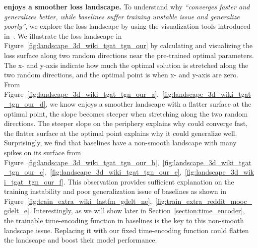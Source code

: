 \noindent\textbf{\our enjoys a smoother loss landscape.}
To understand why \emph{``\our converges faster and generalizes better, while baselines suffer training unstable issue and generalize poorly''}, we explore the loss landscape by using the visualization tools introduced in~\cite{visualloss}.
We illustrate the loss landscape in Figure~\ref{fig:landscape_3d_wiki_tgat_tgn_our} by calculating and visualizing the loss surface along two random directions near the pre-trained optimal parameters. The x- and y-axis indicate how much the optimal solution is stretched along the two random directions, and the optimal point is when x- and y-axis are zero.
 From Figure~\ref{fig:landscape_3d_wiki_tgat_tgn_our_a},~\ref{fig:landscape_3d_wiki_tgat_tgn_our_d}, we know \our enjoys a smoother landscape with a flatter surface at the optimal point, the slope becomes steeper when stretching along the two random directions. The steeper slope on the periphery explains why \our could converge fast, the flatter surface at the optimal point explains why it could generalize well.
 Surprisingly, we find that baselines have a non-smooth landscape with many spikes on its surface from Figure~\ref{fig:landscape_3d_wiki_tgat_tgn_our_b},~\ref{fig:landscape_3d_wiki_tgat_tgn_our_c},~\ref{fig:landscape_3d_wiki_tgat_tgn_our_e},~\ref{fig:landscape_3d_wiki_tgat_tgn_our_f}. This observation provides sufficient explanation on the training instability and poor generalization issue of baselines as shown in Figure~\ref{fig:train_extra_wiki_lastfm_gdelt_ne},~\ref{fig:train_extra_reddit_mooc_gdelt_e}. Interestingly, as we will show later in Section~\ref{section:time_encoder}, the trainable time-encoding function in baselines is the key to this non-smooth landscape issue. Replacing it with our fixed time-encoding function could flatten the landscape and boost their model performance.


